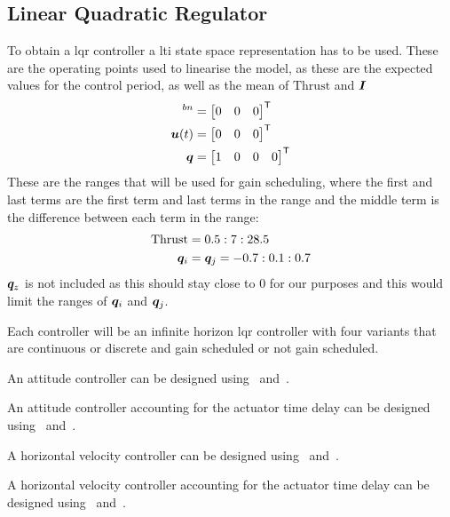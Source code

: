 \subsection{Linear Quadratic Regulator}
\label{subsec:LQR}

To obtain a \gls{lqr} controller a \gls{lti} state space representation has to be used. 
These are the operating points used to linearise the model, as these are the expected values for the control period, as well as the mean of $\mathrm{Thrust}$ and $\bm{I}$
\begin{align}
    [\m \omega^b]^{bn} &= \begin{bmatrix}
        0 & 0 & 0
    \end{bmatrix}\tran \\
    \m u(t) &= \begin{bmatrix}
        0 & 0 & 0
    \end{bmatrix}\tran \\
    \q &= \begin{bmatrix}
        1 & 0 & 0 & 0
    \end{bmatrix}\tran
\end{align}
These are the ranges that will be used for gain scheduling, where the first and last terms are the first term and last terms in the range and the middle term is the difference between each term in the range:
\begin{align}
    \mathrm{Thrust} &= 0.5:7:28.5 \\
    \bm q_i &= \bm q_j = -0.7:0.1:0.7
\end{align}
$\bm q_z$ is not included as this should stay close to 0 for our purposes and this would limit the ranges of $\bm q_i$ and $\bm q_j$.

Each controller will be an infinite horizon \gls{lqr} controller with four variants that are continuous or discrete and gain scheduled or not gain scheduled.

An \gls{attitude} controller can be designed using~ and~.

An \gls{attitude} controller accounting for the actuator time delay can be designed using~ and~.

A horizontal velocity controller can be designed using~ and~.

A horizontal velocity controller accounting for the actuator time delay can be designed using~ and~.
